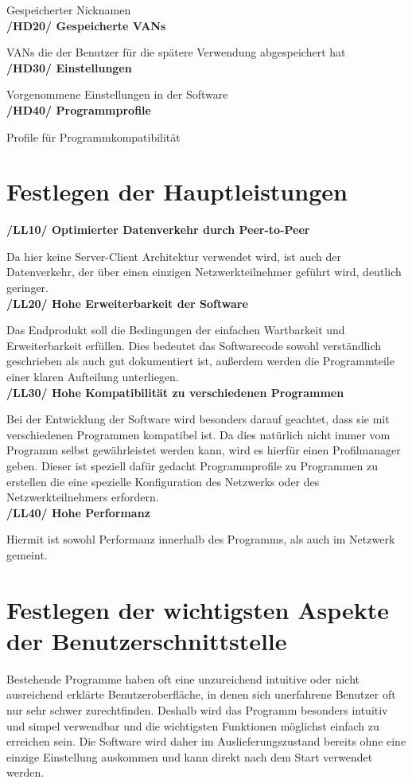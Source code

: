 \documentclass[a4paper,12pt]{scrreprt}
\begin{document}
	Gespeicherter Nicknamen\\
	\textbf {/HD20/ Gespeicherte VANs}
	
	VANs die der Benutzer für die spätere Verwendung abgespeichert hat\\
	\textbf {/HD30/ Einstellungen}
	
	Vorgenommene Einstellungen in der Software\\
	\textbf {/HD40/ Programmprofile}
	
	Profile für Programmkompatibilität
	
	
	\section{Festlegen der Hauptleistungen}
	
	   \textbf{/LL10/ Optimierter Datenverkehr durch Peer-to-Peer}
		
		Da hier keine Server-Client Architektur verwendet wird, ist auch der Datenverkehr, der über einen einzigen Netzwerkteilnehmer geführt wird, deutlich geringer.\\
		\textbf {/LL20/ Hohe Erweiterbarkeit der Software}
		
		Das Endprodukt soll die Bedingungen der einfachen Wartbarkeit und Erweiterbarkeit erfüllen. Dies bedeutet das Softwarecode sowohl verständlich geschrieben als auch gut dokumentiert ist, außerdem werden die Programmteile einer klaren Aufteilung unterliegen.\\
		\textbf {/LL30/ Hohe Kompatibilität zu verschiedenen Programmen}
		
		Bei der Entwicklung der Software wird besonders darauf geachtet, dass sie mit verschiedenen Programmen kompatibel ist. Da dies natürlich nicht immer vom Programm selbst gewährleistet werden kann, wird es hierfür einen Profilmanager geben. Dieser ist speziell dafür gedacht Programmprofile zu Programmen zu erstellen die eine spezielle Konfiguration des Netzwerks oder des Netzwerkteilnehmers erfordern.\\
		\textbf {/LL40/ Hohe Performanz}
		
		Hiermit ist sowohl Performanz innerhalb des Programms, als auch im Netzwerk gemeint.
	\section{Festlegen der wichtigsten Aspekte der Benutzerschnittstelle}
		
	Bestehende Programme haben oft eine unzureichend intuitive oder nicht ausreichend erklärte Benutzeroberfläche, in denen sich unerfahrene Benutzer oft nur sehr schwer zurechtfinden. Deshalb wird das Programm besonders intuitiv und simpel verwendbar und die wichtigsten Funktionen möglichst einfach zu erreichen sein. Die Software wird daher im Auslieferungszustand bereits ohne eine einzige Einstellung auskommen und kann direkt nach dem Start  verwendet werden.
	
\end{document}
